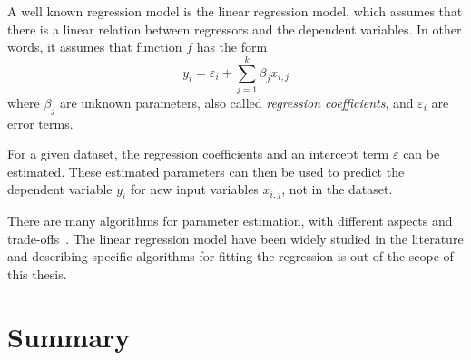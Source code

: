 A well known regression model is the linear regression model, which assumes that there is a linear relation between regressors and the dependent variables.
In other words, it assumes that function $f$ has the form
\[
y_i = \varepsilon_i + \sum_{j=1}^k \beta_j x_{i,j}
\]
where $\beta_j$ are unknown parameters, also called \textit{regression coefficients},
and $\varepsilon_i$ are error terms.


For a given dataset, the regression coefficients and an intercept term $\varepsilon$ can be estimated.
These estimated parameters can then be used to predict the dependent variable $y_i$ for new input variables $x_{i,j}$, not in the dataset.

There are many algorithms for parameter estimation, with different aspects and trade-offs~\citep{seber12}.
The linear regression model have been widely studied in the literature and describing specific algorithms for fitting the regression is out of the scope of this thesis.

\section{Summary}
